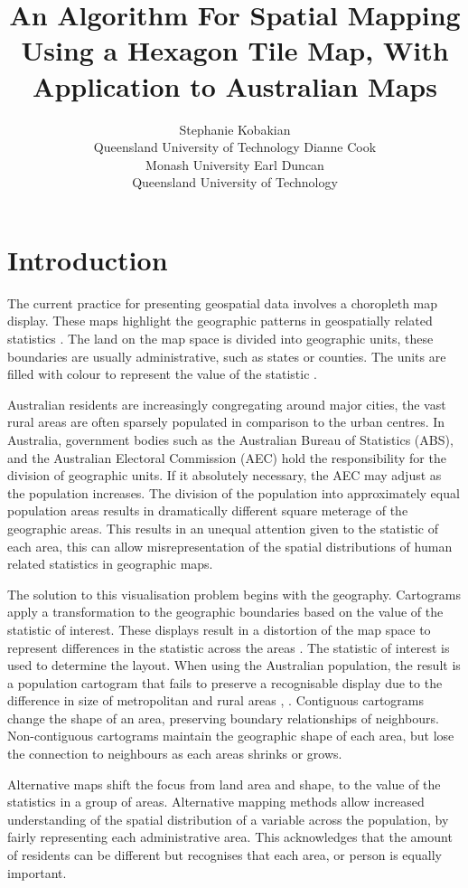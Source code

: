 \documentclass[
]{jss}
\author{
Stephanie Kobakian\\Queensland University of Technology \And Dianne Cook\\Monash University \And Earl Duncan\\Queensland University of Technology
}
\title{An Algorithm For Spatial Mapping Using a Hexagon Tile Map, With
Application to Australian Maps}
\begin{document}
\hypertarget{introduction}{%
\section{Introduction}\label{introduction}}

The current practice for presenting geospatial data involves a
choropleth map display. These maps highlight the geographic patterns in
geospatially related statistics \citep{SAMGIS}. The land on the map
space is divided into geographic units, these boundaries are usually
administrative, such as states or counties. The units are filled with
colour to represent the value of the statistic \citep{EI}.

Australian residents are increasingly congregating around major cities,
the vast rural areas are often sparsely populated in comparison to the
urban centres. In Australia, government bodies such as the Australian
Bureau of Statistics (ABS), and the Australian Electoral Commission
(AEC) hold the responsibility for the division of geographic units. If
it absolutely necessary, the AEC may adjust as the population increases.
The division of the population into approximately equal population areas
results in dramatically different square meterage of the geographic
areas. This results in an unequal attention given to the statistic of
each area, this can allow misrepresentation of the spatial distributions
of human related statistics in geographic maps.

The solution to this visualisation problem begins with the geography.
Cartograms apply a transformation to the geographic boundaries based on
the value of the statistic of interest. These displays result in a
distortion of the map space to represent differences in the statistic
across the areas \citep{ACCAC}. The statistic of interest is used to
determine the layout. When using the Australian population, the result
is a population cartogram that fails to preserve a recognisable display
due to the difference in size of metropolitan and rural areas
\citep{ACTUC}, \citep{GOINO}. Contiguous cartograms change the shape of
an area, preserving boundary relationships of neighbours. Non-contiguous
cartograms maintain the geographic shape of each area, but lose the
connection to neighbours as each areas shrinks or grows.

Alternative maps shift the focus from land area and shape, to the value
of the statistics in a group of areas. Alternative mapping methods allow
increased understanding of the spatial distribution of a variable across
the population, by fairly representing each administrative area. This
acknowledges that the amount of residents can be different but
recognises that each area, or person is equally important.
\end{document}
